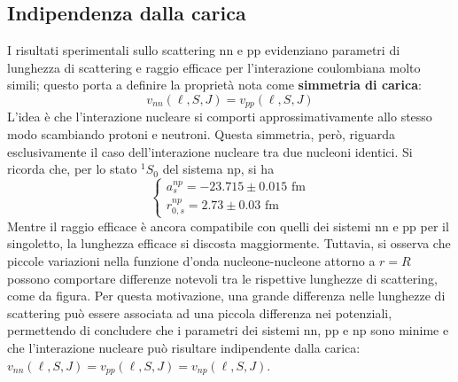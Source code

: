 \documentclass[11pt, a4paper]{scrartcl}
\theoremstyle{style}
\numberwithin{equation}{subsection}
\begin{document}
\subsection{Indipendenza dalla carica}
I risultati sperimentali sullo scattering nn e pp evidenziano parametri di lunghezza di scattering e raggio efficace per l'interazione coulombiana molto simili; questo porta a definire la propriet\`a nota come \textbf{simmetria di carica}: 
\[
v_{nn} (\ell , S , J)  = v_{pp} (\ell ,S,J)
\] 
L'idea \`e che l'interazione nucleare si comporti approssimativamente allo stesso modo scambiando protoni e neutroni.
Questa simmetria, per\`o, riguarda esclusivamente il caso dell'interazione nucleare tra due nucleoni identici.
Si ricorda che, per lo stato $^{1}S_0$ del sistema np, si ha
\[
\begin{cases}
	a_s^{np} = - 23.715 \pm 0.015 \text{ fm}\\
	r_{0,s}^{np} = 2.73 \pm 0.03 \text{ fm}
\end{cases}
\] 
Mentre il raggio efficace \`e ancora compatibile con quelli dei sistemi nn e pp per il singoletto, la lunghezza efficace si discosta maggiormente.
Tuttavia, si osserva che piccole variazioni nella funzione d'onda nucleone-nucleone attorno a $r = R$ possono comportare differenze notevoli tra le rispettive lunghezze di scattering, come da figura.
Per questa motivazione, una grande differenza nelle lunghezze di scattering pu\`o essere associata ad una piccola differenza nei potenziali, permettendo di concludere che i parametri dei sistemi nn, pp e np sono minime e che l'interazione nucleare pu\`o risultare indipendente dalla carica: $v_{nn}(\ell ,S,J) = v_{pp}(\ell ,S,J) = v_{np}(\ell ,S,J)$.
\end{document}

